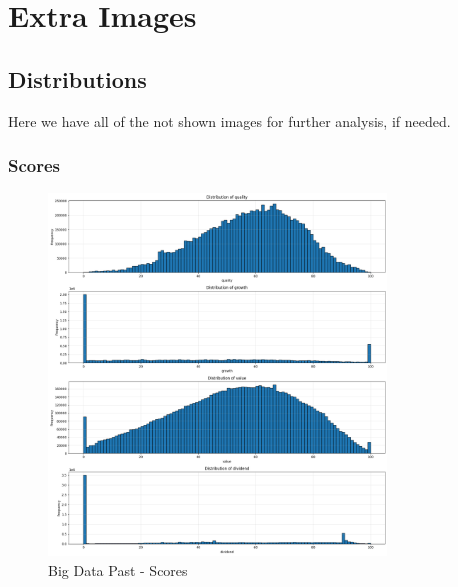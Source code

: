 \documentclass[11pt,english,a4paper,hidelinks]{book}
\begin{document}
\section{Extra Images}

\subsection{Distributions}
Here we have all of the not shown images for further analysis, if needed.

\subsubsection{Scores}
\begin{figure}[H]
    \centering
    \begin{minipage}{0.48\textwidth}
        \centering
        \includegraphics[width=0.8\textwidth]{images/code/descriptive analysis/distributions/Big Data past - Scores.png}
    \caption{Big Data Past - Scores}
    \label{fig:past_scores}
    \end{minipage}\hfill
    \begin{minipage}{0.48\textwidth}
        \centering

\end{minipage}
\end{figure}
\end{document}
